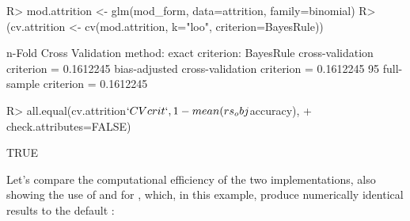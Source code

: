 \documentclass[
]{jss}
\begin{document}
\begin{CodeChunk}
\begin{CodeInput}
R> mod.attrition <- glm(mod_form, data=attrition, family=binomial)
R> (cv.attrition <- cv(mod.attrition, k="loo", criterion=BayesRule))
\end{CodeInput}
\begin{CodeOutput}
n-Fold Cross Validation
method: exact
criterion: BayesRule
cross-validation criterion = 0.1612245
bias-adjusted cross-validation criterion = 0.1612245
95%
full-sample criterion = 0.1612245 
\end{CodeOutput}
\begin{CodeInput}
R> all.equal(cv.attrition$`CV crit`, 1 - mean(rs_obj$accuracy), 
+           check.attributes=FALSE)
\end{CodeInput}
\begin{CodeOutput}
[1] TRUE
\end{CodeOutput}
\end{CodeChunk}

Let's compare the computational efficiency of the two implementations,
also showing the use of  and
 for , which, in this example,
produce numerically identical results to the default
:
\end{document}
